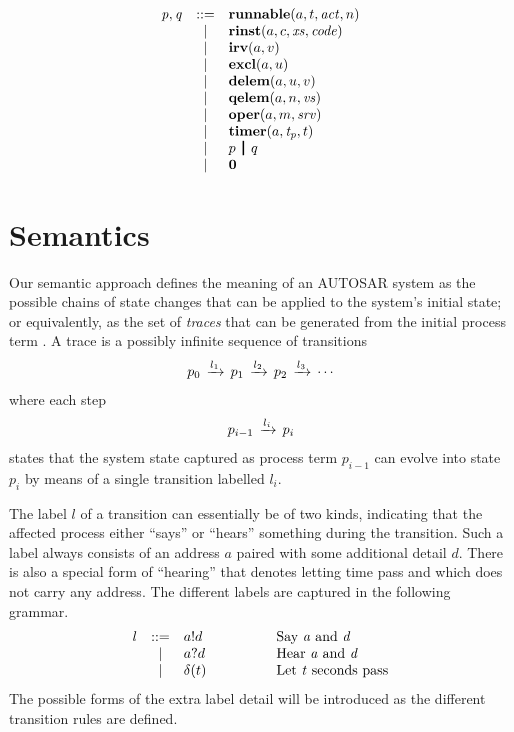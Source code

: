 \documentclass[10pt,conference]{IEEEtran}
\begin{document}
\[
\begin{array}{rcll}
  \V{P},\V{Q}
        & ::= & \Trunnable a t {\Act} n      \\
        & |   & \Trinst a c {\Xs} {\Code}    \\
        & |   & \Tirv a v                    \\
        & |   & \Texcl a u                   \\
        & |   & \Tdelem a u v                \\
        & |   & \Tqelem a n {\Vs}            \\
        & |   & \Toper a m \Srv              \\
        & |   & \Ttimer a {\V{T_p}} t        \\
        & |   & \Tpar p q                    \\
        & |   & \Tzero                       \\
\end{array}
\]


\section{Semantics}
\label{sec:Sem}

Our semantic approach defines the meaning of an AUTOSAR system as the possible chains of state changes that can be applied to the system's initial state; or equivalently, as the set of \emph{traces} that can be generated from the initial process term . A trace is a possibly infinite sequence of transitions
\[
\begin{array}{c}
  {p_0} \,\xrightarrow{l_1}\, {p_1} \,\xrightarrow{l_2}\, {p_2} \,\xrightarrow{l_3}\, \cdots
\end{array}
\]
where each step
\[
\begin{array}{c}
  {p_{i-1}} \,\xrightarrow{l_i}\, {p_i}
\end{array}
\]
states that the system state captured as process term $p_{i-1}$ can evolve into state $p_i$ by means of a single transition labelled $l_i$.

The label $l$ of a transition can essentially be of two kinds, indicating that the affected process either ``says'' or ``hears'' something during the transition. Such a label always consists of an address $a$ paired with some additional detail $d$. There is also a special form of ``hearing'' that denotes letting time pass and which does not carry any address. The different labels are captured in the following grammar.
\[
\begin{array}{rcll}
  l         & ::= & a!d       & \hspace{4em}\text{Say  \V{A} and \V{D}}   \\
            & |   & a?d       & \hspace{4em}\text{Hear \V{A} and \V{D}}   \\
            & |   & \Tdelta t & \hspace{4em}\text{Let \V{T} seconds pass} \\
\end{array}
\]
The possible forms of the extra label detail  will be introduced as the different transition rules are defined.
\end{document}
